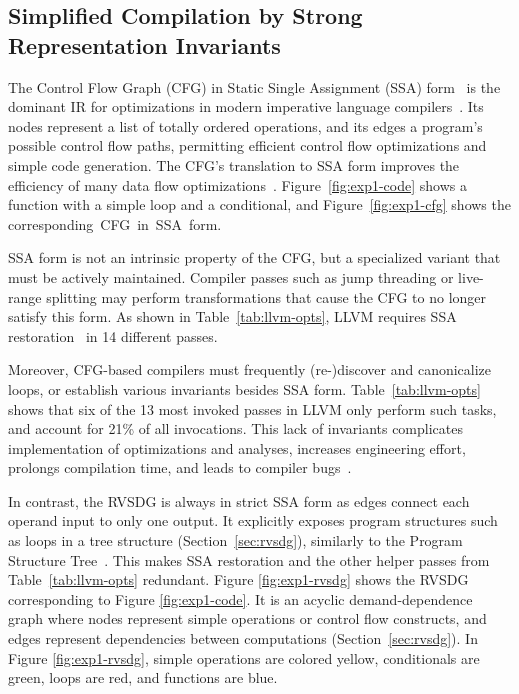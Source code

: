 \subsection{Simplified Compilation by Strong Representation Invariants}\label{sec:rep-invariants}

The Control Flow Graph (CFG) in Static Single Assignment (SSA)
form~\cite{Cytron91} is the dominant IR for optimizations in modern
imperative language compilers~\cite{Stanier13}. %
Its nodes represent a list of totally ordered operations, and its edges a
program's possible control flow paths, permitting efficient control flow
optimizations and simple code generation. %
The CFG's translation to SSA form improves the efficiency of many data flow
optimizations~\cite{Rosen88,Wegman91}. %
Figure~\ref{fig:exp1-code} shows a function with a simple loop and a
conditional, and Figure~\ref{fig:exp1-cfg} shows the
corresponding~CFG~in~SSA~form. %

SSA form is not an intrinsic property of the CFG, but a
specialized variant that must be actively maintained. %
Compiler passes such as jump threading or live-range splitting may perform
transformations that cause the CFG to no longer satisfy this form. %
As shown in Table~\ref{tab:llvm-opts}, LLVM requires SSA restoration~\cite{Choi96} in 14 different
passes.

Moreover, CFG-based compilers must frequently (re-)discover and canonicalize loops,
or establish various invariants besides SSA form. %
Table~\ref{tab:llvm-opts} shows that six of the 13 most invoked passes in LLVM
only perform such tasks, and account for 21\% of all invocations. %
This lack of invariants complicates implementation of optimizations
and analyses, increases engineering effort, prolongs compilation
time, and leads to compiler bugs~\cite{llvm-bug1,llvm-bug2,llvm-bug3}. %

In contrast, the RVSDG is always in strict SSA form as edges connect each operand
input to only one output. It explicitly exposes program structures such as loops
in a tree structure (Section~\ref{sec:rvsdg}), similarly to the Program Structure
Tree~\cite{Johnson94}. This makes SSA restoration and the other helper passes
from Table~\ref{tab:llvm-opts} redundant.
Figure \ref{fig:exp1-rvsdg} shows the RVSDG corresponding
to Figure \ref{fig:exp1-code}. %
It is an acyclic demand-dependence graph where nodes represent simple operations
or control flow constructs, and edges represent dependencies between
computations (Section~\ref{sec:rvsdg}). %
In Figure \ref{fig:exp1-rvsdg}, simple operations are colored yellow,
conditionals are green, loops are red, and functions are blue. %

